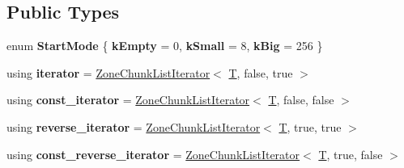 \subsection*{Public Types}
\begin{DoxyCompactItemize}
\item 
\mbox{\label{classv8_1_1internal_1_1ZoneChunkList_a23abd583818fc35654ca5897b2f0572b}} 
enum {\bfseries Start\+Mode} \{ {\bfseries k\+Empty} = 0, 
{\bfseries k\+Small} = 8, 
{\bfseries k\+Big} = 256
 \}
\item 
\mbox{\label{classv8_1_1internal_1_1ZoneChunkList_ac24f3783e7f9641e4e1783fb689a0c07}} 
using {\bfseries iterator} = \mbox{\hyperlink{classv8_1_1internal_1_1ZoneChunkListIterator}{Zone\+Chunk\+List\+Iterator}}$<$ \mbox{\hyperlink{classv8_1_1internal_1_1torque_1_1T}{T}}, false, true $>$
\item 
\mbox{\label{classv8_1_1internal_1_1ZoneChunkList_a632c22365562df6b5fe8b5780ae4a669}} 
using {\bfseries const\+\_\+iterator} = \mbox{\hyperlink{classv8_1_1internal_1_1ZoneChunkListIterator}{Zone\+Chunk\+List\+Iterator}}$<$ \mbox{\hyperlink{classv8_1_1internal_1_1torque_1_1T}{T}}, false, false $>$
\item 
\mbox{\label{classv8_1_1internal_1_1ZoneChunkList_a609709b11c66db21d338fb1515e22c1a}} 
using {\bfseries reverse\+\_\+iterator} = \mbox{\hyperlink{classv8_1_1internal_1_1ZoneChunkListIterator}{Zone\+Chunk\+List\+Iterator}}$<$ \mbox{\hyperlink{classv8_1_1internal_1_1torque_1_1T}{T}}, true, true $>$
\item 
\mbox{\label{classv8_1_1internal_1_1ZoneChunkList_a76c620dcafb242358a1b9468beda4ecd}} 
using {\bfseries const\+\_\+reverse\+\_\+iterator} = \mbox{\hyperlink{classv8_1_1internal_1_1ZoneChunkListIterator}{Zone\+Chunk\+List\+Iterator}}$<$ \mbox{\hyperlink{classv8_1_1internal_1_1torque_1_1T}{T}}, true, false $>$
\end{DoxyCompactItemize}
